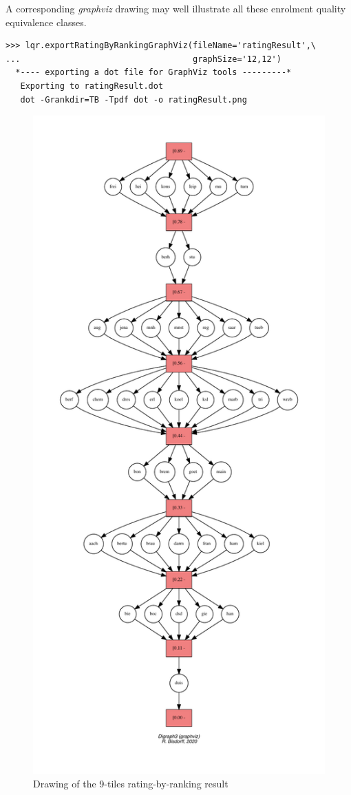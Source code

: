 A corresponding \emph{graphviz} drawing may well illustrate all these enrolment quality equivalence classes.
\begin{lstlisting}
>>> lqr.exportRatingByRankingGraphViz(fileName='ratingResult',\
...                                   graphSize='12,12')
  *---- exporting a dot file for GraphViz tools ---------*
   Exporting to ratingResult.dot
   dot -Grankdir=TB -Tpdf dot -o ratingResult.png
\end{lstlisting}
\begin{figure}[ht]
\includegraphics[height=0.9\vsize]{Figures/14-5-ratingResult.pdf}
\caption{Drawing of the 9-tiles rating-by-ranking result}
\label{fig:14.5}       %
\end{figure}

